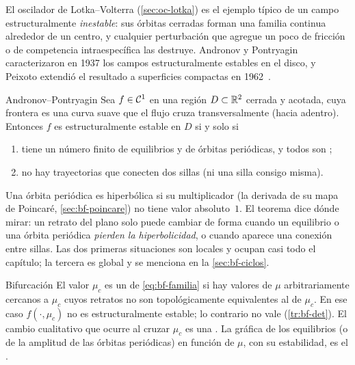 
El oscilador de Lotka--Volterra (\cref{sec:oc-lotka}) es el ejemplo típico de un campo estructuralmente \emph{inestable}: sus órbitas cerradas forman una familia continua alrededor de un centro, y cualquier perturbación que agregue un poco de fricción o de competencia intraespecífica las destruye. Andronov y Pontryagin caracterizaron en 1937 los campos estructuralmente estables en el disco, y Peixoto extendió el resultado a superficies compactas en 1962~\citep{AnPo37,Pei62}.

\begin{teorema}[label=thm:bf-peixoto]{Andronov--Pontryagin \citep[\S4.1]{Per01}}
Sea $f\in\mathcal{C}^{1}$ en una región $D\subset\mathbb{R}^2$ cerrada y acotada, cuya frontera es una curva suave que el flujo cruza transversalmente (hacia adentro). Entonces $f$ es estructuralmente estable en $D$ si y solo si
\begin{enumerate}
  \item tiene un número finito de equilibrios y de órbitas periódicas, y todos son ;
  \item no hay trayectorias que conecten dos sillas (ni una silla consigo misma).
\end{enumerate}
\end{teorema}


Una órbita periódica es hiperbólica si su multiplicador (la derivada de su mapa de Poincaré, \cref{sec:bf-poincare}) no tiene valor absoluto~$1$. El teorema dice dónde mirar: un retrato del plano solo puede cambiar de forma cuando un equilibrio o una órbita periódica \emph{pierden la hiperbolicidad}, o cuando aparece una conexión entre sillas. Las dos primeras situaciones son locales y ocupan casi todo el capítulo; la tercera es global y se menciona en la \cref{sec:bf-ciclos}.

\begin{definicion}[label=def:bf-bifurcacion]{Bifurcación}
El valor $\mu_c$ es un  de \eqref{eq:bf-familia} si hay valores de $\mu$ arbitrariamente cercanos a $\mu_c$ cuyos retratos no son topológicamente equivalentes al de $\mu_c$. En ese caso $f(\cdot,\mu_c)$ no es estructuralmente estable; lo contrario no vale (\cref{tr:bf-det}). El cambio cualitativo que ocurre al cruzar $\mu_c$ es una . La gráfica de los equilibrios (o de la amplitud de las órbitas periódicas) en función de $\mu$, con su estabilidad, es el .
\end{definicion}

